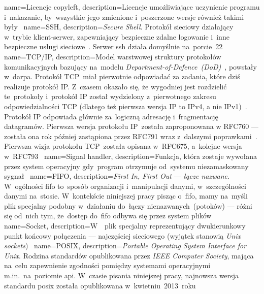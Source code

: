 {
	name={Licencje copyleft},
	description={Licencje umożliwiające uczynienie programu  i~nakazanie, by~wszystkie jego zmienione i~poszerzone wersje również takimi były~\cite{copyleft,wiki:licenses-comparison}}
}
{
	name={SSH},
	description={\emph{Secure Shell}. Protokół sieciowy działający w~trybie klient-serwer, zapewniający bezpieczne zdalne logowanie i~inne bezpieczne usługi sieciowe~\cite{rfc:ssh}. Serwer \gls{ssh} działa domyślnie na~porcie~22}
}
{
	name={TCP/IP},
	description={Model warstwowej struktury protokołów komunikacyjnych bazujący na~modelu \emph{Department-of-Defence~(DoD)}~\cite{rfc:tcpip-dod}, powstały w~\gls{darpa}. Protokół TCP~miał pierwotnie odpowiadać za zadania, które dziś realizuje protokół IP. Z~czasem okazało się, że wygodniej jest rozdzielić te~protokoły i~protokół IP został wydzielony z~pierwotnego zakresu odpowiedzialności TCP (dlatego też pierwsza wersja IP to IPv4, a nie IPv1)~\cite{tcpguide-tcpip-history}. Protokół IP odpowiada głównie za~logiczną adresację i~fragmentację datagramów. Pierwsza wersja protokołu IP~została zaproponowana w RFC760 --- została ona rok później zastąpiona przez RFC791 wraz z~dalszymi poprawkami~\cite{rfc:ip-rfc760,rfc:ip-rfc791}. Pierwsza wizja protokołu TCP~została opisana w~RFC675, a~kolejne wersja w~RFC793~\cite{rfc:tcp-rfc675,rfc:ip-rfc793}}
}
{
	name={Signal handler},
	description={Funkcja, która zostaje wywołana przez system operacyjny gdy~program otrzymuje od~systemu niezamaskowany sygnał~\cite{signal-handler}}
}
{
	name={FIFO},
	description={\emph{First In, First Out} --- \emph{łącze nazwane}. W~ogólności \gls{fifo} to~sposób organizacji i~manipulacji danymi, w~szczególności danymi na~stosie. W~kontekście niniejszej pracy pisząc o~\gls{fifo}, mamy na~myśli plik specjalny podobny w~działaniu do~łączy nienazwanych~(potoków) --- różni się od~nich tym, że~dostęp do~\gls{fifo} odbywa się przez system plików~\cite{fifo-manual}}
}
{
	name={Socket},
	description={W~~plik specjalny reprezentujący dwukierunkowy punkt końcowy połączenia --- najczęściej sieciowego (wyjątek stanowią \emph{Unix sockets})~\cite{socket-definition-oracle}}
}
{
	name={\mbox{POSIX}},
	description={\emph{Portable Operating System Interface for Unix}. Rodzina standardów opublikowana przez \emph{IEEE Computer Society}, mająca na~celu zapewnienie zgodności pomiędzy systemami operacyjnymi m.in.~na~poziomie \acrshort{api}. W~czasie pisania niniejszej pracy, najnowsza wersja standardu \gls{posix} została opublikowana w~kwietniu~2013~roku~\cite{posix-ieee,posix-opengroup}}
}

